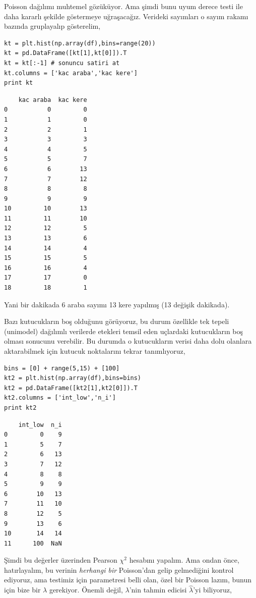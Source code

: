 \documentclass[12pt,fleqn]{article}\usepackage{../../common}
\begin{document}
Poisson dağılımı muhtemel gözüküyor. Ama şimdi bunu uyum derece testi ile
daha kararlı şekilde göstermeye uğraşacağız. Verideki sayımları o sayım
rakamı bazında gruplayalıp gösterelim,

\begin{verbatim}
kt = plt.hist(np.array(df),bins=range(20))
kt = pd.DataFrame([kt[1],kt[0]]).T
kt = kt[:-1] # sonuncu satiri at
kt.columns = ['kac araba','kac kere']
print kt
\end{verbatim}

\begin{verbatim}
    kac araba  kac kere
0           0         0
1           1         0
2           2         1
3           3         3
4           4         5
5           5         7
6           6        13
7           7        12
8           8         8
9           9         9
10         10        13
11         11        10
12         12         5
13         13         6
14         14         4
15         15         5
16         16         4
17         17         0
18         18         1
\end{verbatim}

Yani bir dakikada 6 araba sayımı 13 kere yapılmış (13 değişik dakikada).

Bazı kutucukların boş olduğunu görüyoruz, bu durum özellikle tek tepeli
(unimodel) dağılımlı verilerde etekleri temsil eden uçlardaki kutucukların
boş olması sonucunu verebilir. Bu durumda o kutucukların verisi daha dolu
olanlara aktarabilmek için kutucuk noktalarını tekrar tanımlıyoruz,

\begin{verbatim}
bins = [0] + range(5,15) + [100]
kt2 = plt.hist(np.array(df),bins=bins)
kt2 = pd.DataFrame([kt2[1],kt2[0]]).T
kt2.columns = ['int_low','n_i']
print kt2
\end{verbatim}

\begin{verbatim}
    int_low  n_i
0         0    9
1         5    7
2         6   13
3         7   12
4         8    8
5         9    9
6        10   13
7        11   10
8        12    5
9        13    6
10       14   14
11      100  NaN
\end{verbatim}

Şimdi bu değerler üzerinden Pearson $\chi^2$ hesabını yapalım. Ama ondan
önce, hatırlayalım, bu verinin {\em herhangi bir} Poisson'dan gelip
gelmediğini kontrol ediyoruz, ama testimiz için parametresi belli olan,
özel bir Poisson lazım, bunun için bize bir $\lambda$ gerekiyor. Önemli
değil, $\lambda$'nin tahmin edicisi $\hat{\lambda}$'yi biliyoruz,
\end{document}
